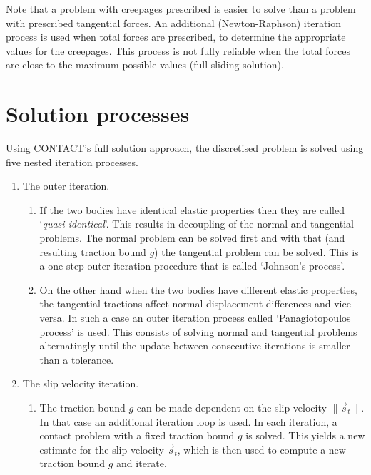 \documentclass[12pt]{report}
\begin{document}
Note that a problem with creepages prescribed is easier to solve than a
problem with prescribed tangential forces. An additional (Newton-Raphson)
iteration process is used when total forces are prescribed, to determine
the appropriate values for the creepages. This process is not fully
reliable when the total forces are close to the maximum possible values
(full sliding solution).

\section{Solution processes}
\label{sec:solut_proc}
\label{sec:iter_const}

Using CONTACT's full solution approach, the discretised problem is solved
using five nested iteration processes.
\begin{enumerate}
\item The outer iteration.
\begin{enumerate}
\item If the two bodies have identical elastic properties then they are
        called `{\em quasi-identical\/}'. This results in decoupling of the
        normal and tangential problems. The normal problem can be solved
        first and with that (and resulting traction bound $g$) the
        tangential problem can be solved. This is a one-step outer
        iteration procedure that is called `Johnson's process'.

\item On the other hand when the two bodies have different elastic
        properties, the tangential tractions affect normal displacement
        differences and vice versa.
        In such a case an outer iteration process called `Panagiotopoulos
        process' is used. This consists of solving normal and tangential
        problems alternatingly until the update between consecutive
        iterations is smaller than a tolerance.
\end{enumerate}

\item\label{itm:slip_veloc} The slip velocity iteration.
\begin{enumerate}
\item The traction bound $g$ 
        can be made dependent on the slip velocity
        $\|\vec{s}_t\|$. In that case an additional iteration loop is used.
        In each iteration, a contact problem with a fixed traction bound $g$
        is solved. This yields a new estimate for the slip velocity
        $\vec{s}_t$, which is then used to compute a new traction bound $g$
        and iterate.
\end{enumerate}


\end{enumerate}
\end{document}
